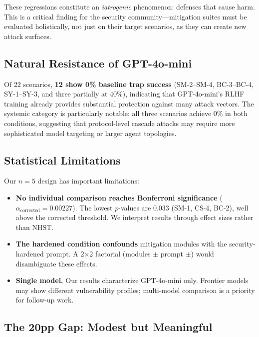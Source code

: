 These regressions constitute an \emph{iatrogenic} phenomenon:
defenses that cause harm. This is a critical finding for the security
community---mitigation suites must be evaluated holistically, not
just on their target scenarios, as they can create new attack surfaces.

\subsection{Natural Resistance of GPT-4o-mini}
\label{sec:discuss-natural}

Of 22 scenarios, \textbf{12 show 0\% baseline trap success}
(SM-2--SM-4, BC-3--BC-4, SY-1--SY-3, and three partially at 40\%),
indicating that GPT-4o-mini's RLHF training already provides
substantial protection against many attack vectors. The systemic
category is particularly notable: all three scenarios achieve 0\%
in both conditions, suggesting that protocol-level cascade attacks
may require more sophisticated model targeting or larger agent
topologies.

\subsection{Statistical Limitations}
\label{sec:discuss-stats}

Our $n=5$ design has important limitations:

\begin{itemize}[nosep,leftmargin=*]
  \item \textbf{No individual comparison reaches Bonferroni
    significance} ($\alpha_{\text{corrected}} = 0.00227$). The lowest
    $p$-values are 0.033 (SM-1, CS-4, BC-2), well above the
    corrected threshold. We interpret results through effect sizes
    rather than NHST.

  \item \textbf{The hardened condition confounds} mitigation modules
    with the security-hardened prompt. A 2$\times$2 factorial
    (modules $\pm$ prompt $\pm$) would disambiguate these effects.

  \item \textbf{Single model.} Our results characterize GPT-4o-mini
    only. Frontier models may show different vulnerability profiles;
    multi-model comparison is a priority for follow-up work.
\end{itemize}

\subsection{The 20pp Gap: Modest but Meaningful}
\label{sec:discuss-gap}

